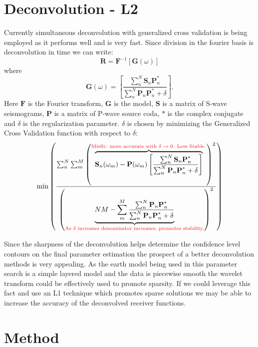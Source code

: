 \documentclass[jgrga]{agutex}
\newcommand{\bt}[1]{\textbf{#1}}
\newcommand{\bc}[1]{\mathcal{\textbf{#1}}}
\newcommand{\ub}[1]{\underbrace{#1}}
\newcommand{\ob}[1]{\overbrace{#1}}
\begin{document}
\begin{article}
\section{Deconvolution - L2}
Currently simultaneous deconvolution with generalized cross validation is being employed as it performs well and is very fast. Since division in the fourier basis is deconvolution in time we can write:
\[ \bc{R} = \bc{F}^{-1}[\bc{G}(\omega)]  \]
where
\begin{equation}
 \bc{G}(\omega) = \left[ \frac{\sum_n^N \bt{S}_n\bt{P}_n^*}{\sum_n^N \bt{P}_n\bt{P}_n^* + \delta}  \right].
\end{equation}
Here $\bc{F}$ is the Fourier transform, $\bc{G}$ is the model, $\bt{S}$ is a matrix of S-wave seismograms, $\bt{P}$ is a matrix of P-wave source coda, $*$ is the complex conjugate and $\delta$ is the regularization parameter. $\delta$ is chosen by minimizing the Generalized Cross Validation function with respect to $\delta$:
\begin{equation}
\text{min} \left( \frac{ \sum_n^N \sum_m^M 
 \left( \ob{ \bt{S}_n(\omega_m) - \bt{P}(\omega_m) \left[ \frac{\sum_n^N \bt{S}_n\bt{P}_n^*} {\sum_n^N \bt{P}_n\bt{P}_n^* + \delta}  \right]}^{\text{\textcolor{red}{ Misfit: more accurate with $\delta\rightarrow0$. Less Stable }}} \right)^2}  { \left( 
\ub{  NM - \sum_m^M  \frac {\sum_n^N \bt{P}_n\bt{P}_n^*}  {\sum_n^N \bt{P}_n\bt{P}_n^* + \delta}  }_{\text{\textcolor{red}{ {As $\delta$ increases denominator increases, promotes stability.}}}} \right)^2  }  \right)
\end{equation}

Since the sharpness of the deconvolution helps determine the confidence level contours on the final parameter estimation the prospect of a better deconvolution methods is very appealing. As the earth model being used in this parameter search is a simple layered model and the data is piecewise smooth the wavelet transform could be effectively used to promote sparsity. If we could leverage this fact and use an L1 technique which promotes sparse solutions we may be able to increase the accuracy of the deconvolved receiver functions. 


\section{Method}


\end{article}
\end{document}
